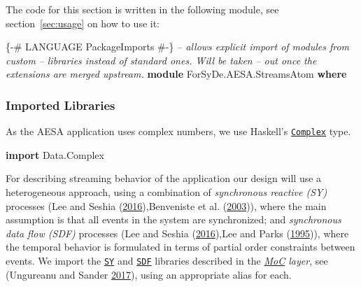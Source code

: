 \documentclass[
  a4paper,
]{article}
\newenvironment{Shaded}{}{}
\newcommand{\CommentTok}[1]{\textcolor[rgb]{0.38,0.63,0.69}{\textit{#1}}}
\newcommand{\DataTypeTok}[1]{\textcolor[rgb]{0.56,0.13,0.00}{#1}}
\newcommand{\KeywordTok}[1]{\textcolor[rgb]{0.00,0.44,0.13}{\textbf{#1}}}
\newcommand{\OtherTok}[1]{\textcolor[rgb]{0.00,0.44,0.13}{#1}}
\begin{document}
The code for this section is written in the following module, see
section~\ref{sec:usage} on how to use it:

\begin{Shaded}
\begin{Highlighting}[numbers=left,,firstnumber=33,]
\OtherTok{\{-# LANGUAGE PackageImports #-\}} \CommentTok{-- allows explicit import of modules from custom}
                                \CommentTok{-- libraries instead of standard ones. Will be taken}
                                \CommentTok{-- out once the extensions are merged upstream.}
\KeywordTok{module} \DataTypeTok{ForSyDe.AESA.StreamsAtom} \KeywordTok{where}
\end{Highlighting}
\end{Shaded}

\hypertarget{imported-libraries}{%
\subsubsection{Imported Libraries}\label{imported-libraries}}

As the AESA application uses complex numbers, we use Haskell's
\href{http://hackage.haskell.org/package/base/docs/Data-Complex.html}{\texttt{Complex}}
type.

\begin{Shaded}
\begin{Highlighting}[numbers=left,,firstnumber=43,]
\KeywordTok{import} \DataTypeTok{Data.Complex}
\end{Highlighting}
\end{Shaded}

For describing streaming behavior of the application our design will use
a heterogeneous approach, using a combination of \emph{synchronous
reactive (SY)} processes (Lee and Seshia
(\protect\hyperlink{ref-leeseshia-15}{2016}),Benveniste et al.
(\protect\hyperlink{ref-Benveniste03}{2003})), where the main assumption
is that all events in the system are synchronized; and \emph{synchronous
data flow (SDF)} processes (Lee and Seshia
(\protect\hyperlink{ref-leeseshia-15}{2016}),Lee and Parks
(\protect\hyperlink{ref-lee95}{1995})), where the temporal behavior is
formulated in terms of partial order constraints between events. We
import the
\href{https://forsyde.github.io/forsyde-atom/api/ForSyDe-Atom-MoC-SY.html}{\texttt{SY}}
and
\href{https://forsyde.github.io/forsyde-atom/api/ForSyDe-Atom-MoC-SDF.html}{\texttt{SDF}}
libraries described in the
\emph{\href{https://forsyde.github.io/forsyde-atom/api/ForSyDe-Atom-MoC.html}{MoC}
layer}, see (Ungureanu and Sander
\protect\hyperlink{ref-ungureanu17}{2017}), using an appropriate alias
for each.
\end{document}
